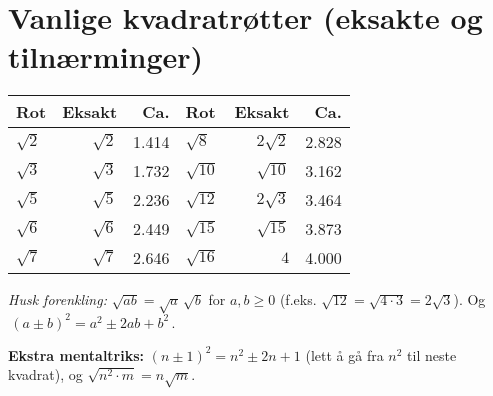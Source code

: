 \documentclass[11pt]{article}
\begin{document}
\section*{Vanlige kvadratr\o tter (eksakte og tiln\ae rminger)}
\small
\begin{center}
\begin{tabular}{lrr@{\quad}lrr}
\toprule
\textbf{Rot} & \textbf{Eksakt} & \textbf{Ca.} & \textbf{Rot} & \textbf{Eksakt} & \textbf{Ca.} \\
\midrule
$\sqrt{2}$  & $\sqrt{2}$  & 1.414 & $\sqrt{8}$  & $2\sqrt{2}$ & 2.828 \\
$\sqrt{3}$  & $\sqrt{3}$  & 1.732 & $\sqrt{10}$ & $\sqrt{10}$ & 3.162 \\
$\sqrt{5}$  & $\sqrt{5}$  & 2.236 & $\sqrt{12}$ & $2\sqrt{3}$ & 3.464 \\
$\sqrt{6}$  & $\sqrt{6}$  & 2.449 & $\sqrt{15}$ & $\sqrt{15}$ & 3.873 \\
$\sqrt{7}$  & $\sqrt{7}$  & 2.646 & $\sqrt{16}$ & $4$          & 4.000 \\
\bottomrule
\end{tabular}
\end{center}

\vspace{2mm}
\noindent\textit{Husk forenkling:} $\sqrt{ab}=\sqrt{a}\,\sqrt{b}$ for $a,b\ge0$ (f.eks. $\sqrt{12}=\sqrt{4\cdot3}=2\sqrt{3}$). Og $\,(a\pm b)^2=a^2\pm2ab+b^2\,.$

\vspace{2mm}
\noindent\textbf{Ekstra mentaltriks:} $(n\pm1)^2=n^2\pm2n+1$ (lett å gå fra $n^2$ til neste kvadrat), og $\sqrt{n^2\cdot m}=n\sqrt{m}$.
\end{document}
